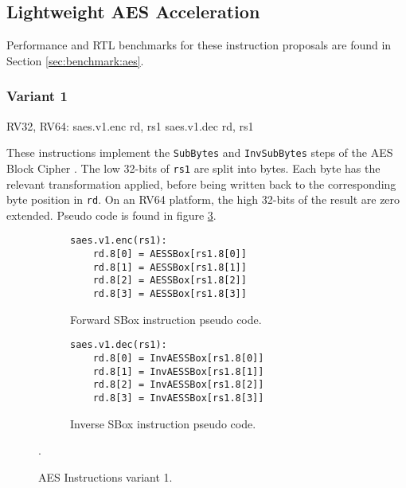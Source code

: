 
\newpage
\subsection{Lightweight AES Acceleration}




Performance and RTL benchmarks for these
instruction proposals are found in Section
\ref{sec:benchmark:aes}.

\subsubsection{Variant 1}

\begin{cryptoisa}
RV32, RV64:
    saes.v1.enc rd, rs1
    saes.v1.dec rd, rs1
\end{cryptoisa}

These instructions implement the 
{\tt SubBytes} \cite[Section 5.1.1]{nist:fips:197}
and
{\tt InvSubBytes} \cite[Section 5.3.1]{nist:fips:197}
steps of the AES Block Cipher \cite{nist:fips:197}.
The low 32-bits of {\tt rs1} are split into bytes.
Each byte has the relevant transformation applied, before
being written back to the corresponding byte position in {\tt rd}.
On an RV64 platform, the high 32-bits of the result are zero
extended.
Pseudo code is found in figure
\ref{fig:pseudo:aes:v1}.

\begin{figure}
\begin{subfigure}[b]{0.5\textwidth}
\begin{lstlisting}
saes.v1.enc(rs1):
    rd.8[0] = AESSBox[rs1.8[0]]
    rd.8[1] = AESSBox[rs1.8[1]]
    rd.8[2] = AESSBox[rs1.8[2]]
    rd.8[3] = AESSBox[rs1.8[3]]
\end{lstlisting}
\caption{Forward SBox instruction pseudo code.}
\label{fig:pseudo:aes:v1:sub:enc}
\end{subfigure}
\begin{subfigure}[b]{0.5\textwidth}
\begin{lstlisting}
saes.v1.dec(rs1):
    rd.8[0] = InvAESSBox[rs1.8[0]]
    rd.8[1] = InvAESSBox[rs1.8[1]]
    rd.8[2] = InvAESSBox[rs1.8[2]]
    rd.8[3] = InvAESSBox[rs1.8[3]]
\end{lstlisting}
\label{fig:pseudo:aes:v1:sub:dec}
\caption{Inverse SBox instruction pseudo code.}
\end{subfigure}
\caption{AES Instructions variant 1.}
\label{fig:pseudo:aes:v1}.
\end{figure}

